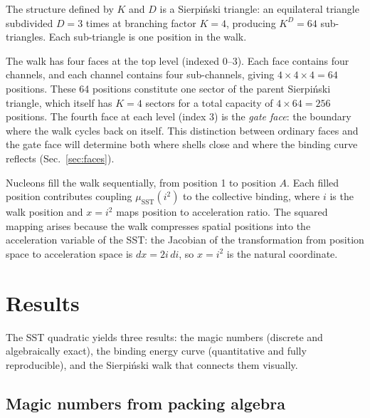 \documentclass[fleqn,usenatbib]{mnras}
\begin{document}
The structure defined by $K$ and $D$ is a Sierpi\'nski triangle: an equilateral triangle subdivided $D = 3$ times at branching factor $K = 4$, producing $K^D = 64$ sub-triangles. Each sub-triangle is one position in the walk.

The walk has four faces at the top level (indexed 0--3). Each face contains four channels, and each channel contains four sub-channels, giving $4 \times 4 \times 4 = 64$ positions. These 64 positions constitute one sector of the parent Sierpi\'nski triangle, which itself has $K = 4$ sectors for a total capacity of $4 \times 64 = 256$ positions. The fourth face at each level (index 3) is the \emph{gate face}: the boundary where the walk cycles back on itself. This distinction between ordinary faces and the gate face will determine both where shells close and where the binding curve reflects (Sec.~\ref{sec:faces}).

Nucleons fill the walk sequentially, from position 1 to position $A$. Each filled position contributes coupling $\mu_{\mathrm{SST}}(i^2)$ to the collective binding, where $i$ is the walk position and $x = i^2$ maps position to acceleration ratio. The squared mapping arises because the walk compresses spatial positions into the acceleration variable of the SST: the Jacobian of the transformation from position space to acceleration space is $dx = 2i\,di$, so $x = i^2$ is the natural coordinate.

\section{Results}
\label{sec:results}

The SST quadratic yields three results: the magic numbers (discrete and algebraically exact), the binding energy curve (quantitative and fully reproducible), and the Sierpi\'nski walk that connects them visually.

\subsection{Magic numbers from packing algebra}
\label{sec:magic}
\end{document}
